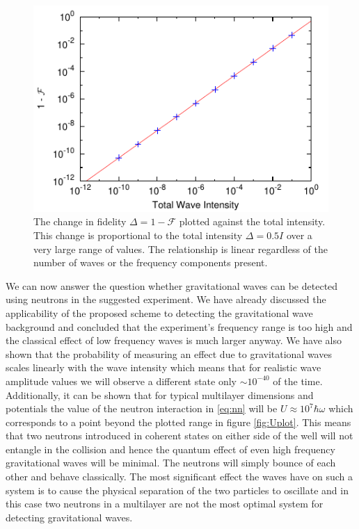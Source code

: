 \begin{figure}[htbp]
  \begin{center}
    \includegraphics[width=120mm]{Images/WaveMags.pdf}
    \caption{\label{fig:WaveMags} The change in fidelity $\Delta = 1 -
      \mathcal{F}$ plotted against the total intensity. This change is
      proportional to the total intensity $\Delta = 0.5I$ over a very
      large range of values. The relationship is linear regardless of
      the number of waves or the frequency components present. }
  \end{center}
\end{figure}

We can now answer the question whether gravitational waves can be
detected using neutrons in the suggested experiment. We have already
discussed the applicability of the proposed scheme to detecting the
gravitational wave background and concluded that the experiment's
frequency range is too high and the classical effect of low frequency
waves is much larger anyway. We have also shown that the probability
of measuring an effect due to gravitational waves scales linearly with
the wave intensity which means that for realistic wave amplitude
values we will observe a different state only $\sim 10^{-40}$ of the
time. Additionally, it can be shown that for typical multilayer
dimensions and potentials the value of the neutron interaction in
\eqref{eq:nn} will be $U \approx 10^7 \hbar\omega$ which corresponds
to a point beyond the plotted range in figure \ref{fig:Uplot}. This
means that two neutrons introduced in coherent states on either side
of the well will not entangle in the collision and hence the quantum
effect of even high frequency gravitational waves will be minimal. The
neutrons will simply bounce of each other and behave classically. The
most significant effect the waves have on such a system is to cause
the physical separation of the two particles to oscillate and in this
case two neutrons in a multilayer are not the most optimal system for
detecting gravitational waves.


